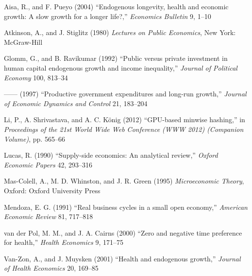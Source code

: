 \documentclass{cje}          %
\theoremstyle{plain}%
\theoremstyle{definition}
\theoremstyle{remark}
\begin{document}
\begin{thebibliography}{10}
\newcommand{\enquote}[1]{``#1''}
\providecommand{\natexlab}[1]{#1}

Aisa, R., and F. Pueyo (2004) \enquote{Endogenous longevity, health and
  economic growth: A slow growth for a longer life?,} \emph{Economics Bulletin}
  9, 1--10

Atkinson, A., and J. Stiglitz (1980) \emph{Lectures on Public Economics}, New
  York: McGraw-Hill

Glomm, G., and B. Ravikumar (1992) \enquote{Public versus private investment in
  human capital endogenous growth and income inequality,} \emph{Journal of
  Political Economy} 100, 813--34

------ (1997) \enquote{Productive government expenditures and long-run
  growth,} \emph{Journal of Economic Dynamics and Control} 21, 183--204

Li, P., A. Shrivastava, and A. C. K{\"o}nig (2012) \enquote{{GPU}-based minwise
  hashing,} in \emph{Proceedings of the 21st World Wide Web Conference (WWW
  2012) (Companion Volume)}, pp. 565--66

Lucas, R. (1990) \enquote{Supply-side economics: An analytical review,}
  \emph{Oxford Economic Papers} 42, 293--316

Mas-Colell, A., M. D. Whinston, and J. R. Green (1995) \emph{Microeconomic
  Theory}, Oxford: Oxford University Press

Mendoza, E. G. (1991) \enquote{Real business cycles in a small open economy,}
  \emph{American Economic Review} 81, 717--818

van der Pol, M. M., and J. A. Cairns (2000) \enquote{Zero and negative time
  preference for health,} \emph{Health Economics} 9, 171--75

Van-Zon, A., and J. Muysken (2001) \enquote{Health and endogenous growth,}
  \emph{Journal of Health Economics} 20, 169--85

\end{thebibliography}


\label{lastpage}
\end{document}
